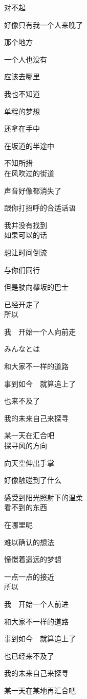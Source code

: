 对不起

好像只有我一个人来晚了

那个地方

一个人也没有

应该去哪里

我也不知道

单程的梦想

还拿在手中

在坂道的半途中

不知所措
\\

在风吹过的街道

声音好像都消失了

跟你打招呼的合适话语

我并没有找到
\\

如果可以的话

想让时间倒流

与你们同行

但是驶向欅坂的巴士

已经开走了
\\

所以

我　开始一个人向前走

みんなとは

和大家不一样的道路

事到如今　就算追上了

也来不及了

我的未来自己来探寻

某一天在汇合吧
\\

探寻风的方向

向天空伸出手掌

好像触碰到了什么

感受到阳光照射下的温柔
\\

看不到的东西

在哪里呢

难以确认的想法

憧憬着遥远的梦想

一点一点的接近
\\

所以

我　开始一个人前进

和大家不一样的道路

事到如今　就算追上了

也已经来不及了

我的未来自己来探寻

某一天在某地再汇合吧
\\


